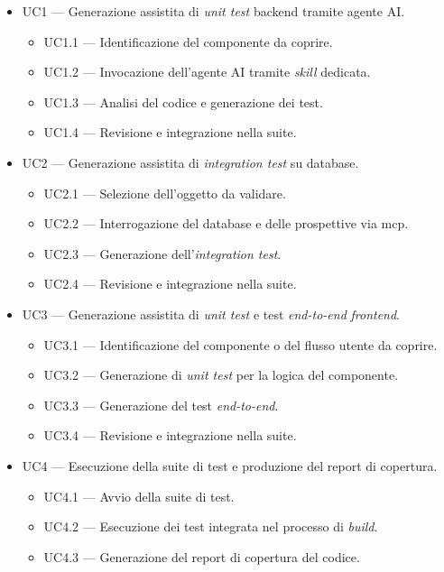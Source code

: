 \begin{itemize}
  \item UC1 --- Generazione assistita di \emph{unit test} backend tramite agente AI.
        \begin{itemize}
          \item UC1.1 --- Identificazione del componente da coprire.
          \item UC1.2 --- Invocazione dell'agente AI tramite \emph{skill} dedicata.
          \item UC1.3 --- Analisi del codice e generazione dei test.
          \item UC1.4 --- Revisione e integrazione nella suite.
        \end{itemize}
  \item UC2 --- Generazione assistita di \emph{integration test} su database.
        \begin{itemize}
          \item UC2.1 --- Selezione dell'oggetto da validare.
          \item UC2.2 --- Interrogazione del database e delle prospettive via \gls{mcp}.
          \item UC2.3 --- Generazione dell'\emph{integration test}.
          \item UC2.4 --- Revisione e integrazione nella suite.
        \end{itemize}
  \item UC3 --- Generazione assistita di \emph{unit test} e test \emph{end-to-end} \emph{frontend}.
        \begin{itemize}
          \item UC3.1 --- Identificazione del componente o del flusso utente da coprire.
          \item UC3.2 --- Generazione di \emph{unit test} per la logica del componente.
          \item UC3.3 --- Generazione del test \emph{end-to-end}.
          \item UC3.4 --- Revisione e integrazione nella suite.
        \end{itemize}
  \item UC4 --- Esecuzione della suite di test e produzione del report di copertura.
        \begin{itemize}
          \item UC4.1 --- Avvio della suite di test.
          \item UC4.2 --- Esecuzione dei test integrata nel processo di \emph{build}.
          \item UC4.3 --- Generazione del report di copertura del codice.

\end{itemize}
\end{itemize}

